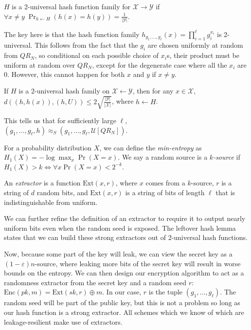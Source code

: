 \documentclass[10pt]{article}
\newcommand{\unif}[1]{\mathcal{U}\left[{#1}\right]}
\begin{document}
\begin{definition}
$H$ is a 2-universal hash function family for $\mathcal{X} \rightarrow \mathcal{Y}$ if $\forall x \neq y \; \Pr_{h \leftarrow H}(h(x) = h(y)) = \frac{1}{|\mathcal{Y}|}$.
\end{definition}

The key here is that the hash function family $h_{g_1,\dots,g_\ell}(x) = \prod_{i=1}^\ell g_i ^ {x_i}$ is 2-universal. This follows from the fact that the $g_i$ are chosen uniformly at random from $QR_N$, so conditional on each possible choice of $x_i$s, their product must be uniform at random over $QR_N$, except for the degenerate case where all the $x_i$ are $0$. However, this cannot happen for both $x$ and $y$ if $x \neq y$.

\begin{lemma}
If $H$ is a 2-universal hash family on $\mathcal{X} \leftarrow \mathcal{Y}$, then for any $x \in \mathcal{X}$, $d((h,h(x)), (h,U)) \le 2\sqrt{\frac{|\mathcal{Y}|}{|\mathcal{X}|}}$, where $h \leftarrow H$.
\end{lemma}

This tells us that for sufficiently large $\ell$, $(g_1,\dots,g_\ell,h) \approx_S (g_1,\dots,g_\ell,\unif{QR_N})$.

\begin{definition}
For a probability distribution $X$, we can define the \emph{min-entropy} as $H_1(X) = -\log \max_x \Pr(X = x)$. We say a random source is a \emph{$k$-source} if $H_1(X) > k \iff \forall x \Pr(X = x) < 2^{-k}$.
\end{definition}

\begin{definition}
An \emph{extractor} is a function $\mathrm{Ext}(x,r)$, where $x$ comes from a $k$-source, $r$ is a string of $d$ random bits, and $\mathrm{Ext}(x,r)$ is a string of bits of length $\ell$ that is indistinguishable from uniform.
\end{definition}

We can further refine the definition of an extractor to require it to output nearly uniform bits even when the random seed is exposed. The leftover hash lemma states that we can build these strong extractors out of 2-universal hash functions.


Now, because some part of the key will leak, we can view the secret key as a $(1-\varepsilon)n$-source, where leaking more bits of the secret key will result in worse bounds on the entropy. We can then design our encryption algorithm to act as a randomness extractor from the secret key and a random seed $r$: $\mathrm{Enc}(pk,m) = \mathrm{Ext}(sk,r) \oplus m$. In our case, $r$ is the tuple $(g_1,\dots,g_\ell)$. The random seed will be part of the public key, but this is not a problem so long as our hash
function is a strong extractor. All schemes which we know of which are leakage-resilient make
use of extractors.
\end{document}
